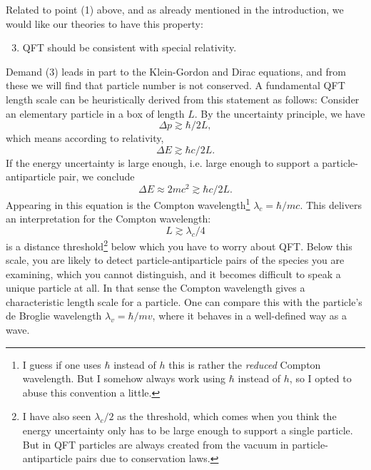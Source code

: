 Related to point (1) above, and as already mentioned in the introduction, we
would like our theories to have this property:
\begin{enumerate}
  \setcounter{enumi}{2}
  \item QFT should be consistent with special relativity.
\end{enumerate}
Demand (3) leads in part to the Klein-Gordon and Dirac equations, and from these
we will find that particle number is not conserved.
A fundamental QFT length scale can be heuristically derived from this statement 
as follows: Consider an elementary particle in a box of length $L$. By the 
uncertainty principle, we have
\begin{equation}
  \Delta p\gtrsim \hbar/2L,
\end{equation}
which means according to relativity,
\begin{equation}
  \Delta E\gtrsim \hbar c/2L.
\end{equation}
If the energy uncertainty is large enough, i.e. large enough to support a
particle-antiparticle pair, we conclude
\begin{equation}
  \Delta E\approx 2mc^2 \gtrsim\hbar c/2L.
\end{equation}
Appearing in this equation is the Compton wavelength\footnote{I guess if
one uses $\hbar$ instead of $h$ this is rather the {\it reduced} Compton
wavelength. But I somehow always work using $\hbar$ instead of $h$, so I opted
to abuse this convention a little.}
$\lambda_c=\hbar/mc$. This delivers an interpretation for the Compton wavelength:
\begin{equation}
  L \gtrsim \lambda_c/4
\end{equation}
is a distance threshold\footnote{I have also seen $\lambda_c/2$ as the threshold,
which comes when you think the energy uncertainty only has to be large enough to
support a single particle. But in QFT particles are always created from the
vacuum in particle-antiparticle pairs due to conservation laws.} below which 
you have to worry about QFT. Below this scale, you are likely to detect
particle-antiparticle pairs of the species you are examining, which you cannot
distinguish, and it becomes difficult to speak a unique particle at all. In that
sense the Compton wavelength gives a characteristic length scale for a
particle. One can compare this with the particle's de Broglie wavelength
$\lambda_v=\hbar/mv$, where it behaves in a well-defined way as a wave.


